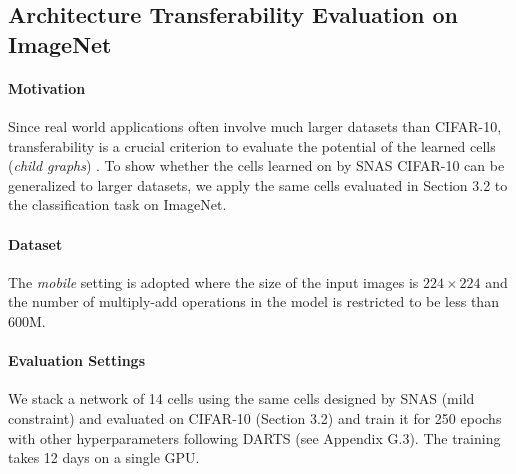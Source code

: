 \documentclass{article} \usepackage{iclr2019_conference,times}
\newcommand{\zh}{\color{black}}
\begin{document}
\subsection{Architecture Transferability Evaluation on ImageNet}

\paragraph{Motivation}

Since real world applications often involve much larger datasets than CIFAR-10, transferability is a crucial criterion to evaluate the potential of the learned cells (\textit{child graphs}) \citep{zoph2017learning}. To show whether the cells learned on by SNAS CIFAR-10 can be generalized to larger datasets, we apply the same cells evaluated in Section 3.2 to the classification task on ImageNet.

\paragraph{Dataset}

The \textit{mobile} setting is adopted where the size of the input images is $224\times 224$ and the number of multiply-add operations in the model is restricted to be less than 600M.

\paragraph{Evaluation Settings}

We stack a network of 14 cells using the same cells designed by SNAS (mild constraint) and evaluated on CIFAR-10 (Section 3.2) and train it for {\zh 250} epochs with other hyperparameters following DARTS (see Appendix G.3). The training takes 12 days on a single GPU.
\end{document}
